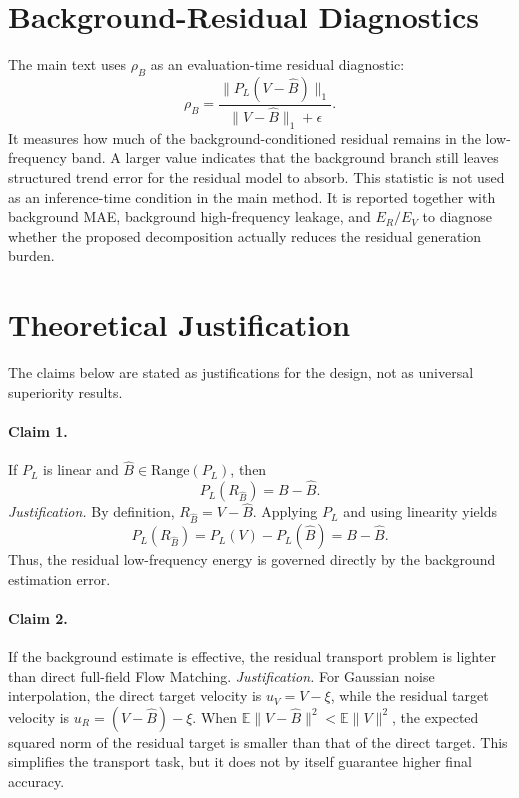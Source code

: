 \documentclass[letterpaper]{article}
\begin{document}
\section{Background-Residual Diagnostics}
The main text uses $\rho_B$ as an evaluation-time residual diagnostic:
\begin{equation}
\rho_B=
\frac{\|P_L(V-\hat B)\|_1}{\|V-\hat B\|_1+\epsilon}.
\end{equation}
It measures how much of the background-conditioned residual remains in the low-frequency band. A larger value indicates that the background branch still leaves structured trend error for the residual model to absorb. This statistic is not used as an inference-time condition in the main method. It is reported together with background MAE, background high-frequency leakage, and $E_R/E_V$ to diagnose whether the proposed decomposition actually reduces the residual generation burden.

\section{Theoretical Justification}
The claims below are stated as justifications for the design, not as universal superiority results.

\paragraph{Claim 1.}
If $P_L$ is linear and $\hat B\in\mathrm{Range}(P_L)$, then
\begin{equation}
P_L(R_{\hat B})=B-\hat B.
\end{equation}
\textit{Justification.}
By definition, $R_{\hat B}=V-\hat B$. Applying $P_L$ and using linearity yields
\begin{equation}
P_L(R_{\hat B})=P_L(V)-P_L(\hat B)=B-\hat B.
\end{equation}
Thus, the residual low-frequency energy is governed directly by the background estimation error.

\paragraph{Claim 2.}
If the background estimate is effective, the residual transport problem is lighter than direct full-field Flow Matching.
\textit{Justification.}
For Gaussian noise interpolation, the direct target velocity is $u_V=V-\xi$, while the residual target velocity is $u_R=(V-\hat B)-\xi$. When $\mathbb E\|V-\hat B\|^2<\mathbb E\|V\|^2$, the expected squared norm of the residual target is smaller than that of the direct target. This simplifies the transport task, but it does not by itself guarantee higher final accuracy.
\end{document}
